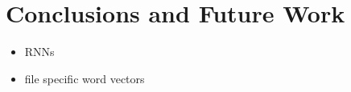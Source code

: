 \section{Conclusions and Future Work}

\begin{itemize}
  \item RNNs
  \item file specific word vectors
\end{itemize}
